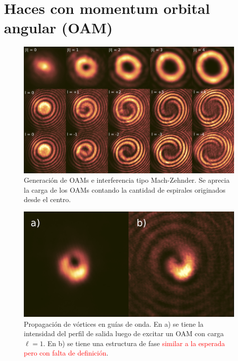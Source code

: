 \chapter{Haces con momentum orbital angular (OAM)}

\begin{figure}[H]
	\centering
	\includegraphics[width=0.8\linewidth]{media/OAM-free.png}
	\caption[Generación de OAMs e interferencia tipo Mach-Zehnder.]{Generación de OAMs e interferencia tipo Mach-Zehnder. Se aprecia la carga de los OAMs contando la cantidad de espirales originados desde el centro.}
\end{figure}

\begin{figure}[H]
	\centering
	\includegraphics[width=0.8\linewidth]{media/vortex.png}
	\caption[Propagación de vórtices en guías de onda.]{Propagación de vórtices en guías de onda. En a) se tiene la intensidad del perfil de salida luego de excitar un OAM con carga $\ell=1$. En b) se tiene una estructura de fase \textcolor{red}{similar a la esperada pero con falta de definición}.}
\end{figure}